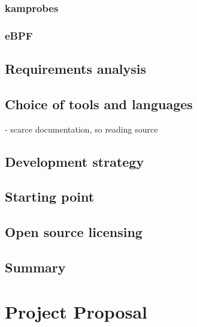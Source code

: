 \documentclass[12pt,twoside,notitlepage]{report}
\begin{document}
        \subsection{kamprobes}
        \subsection{eBPF}
   
    \section {Requirements analysis} 
        
    \section{Choice of tools and languages}

        - scarce documentation, so reading source

    \section{Development strategy}

    \section{Starting point}

    \section{Open source licensing}

    \section{Summary}

\printbibliography

\chapter*{Project Proposal}

%
\end{document}
